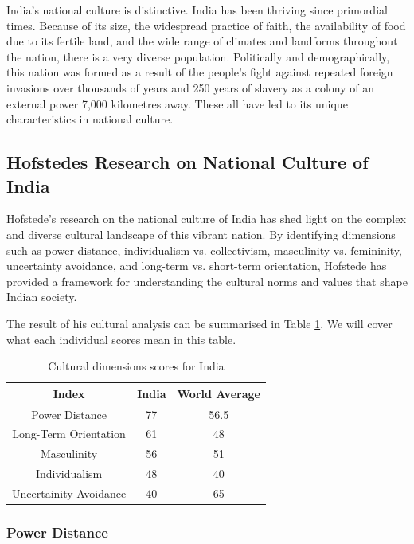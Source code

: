 \documentclass{article}
\begin{document}
India's national culture is distinctive. India has been thriving since primordial times. Because of its size, the widespread practice of faith, the availability of food due to its fertile land, and the wide range of climates and landforms throughout the nation, there is a very diverse population. Politically and demographically, this nation was formed as a result of the people's fight against repeated foreign invasions over thousands of years and 250 years of slavery as a colony of an external power 7,000 kilometres away. These all have led to its unique characteristics in national culture.

\subsection{Hofstedes Research on National Culture of India}

Hofstede's research on the national culture of India\cite{ref:Hofstede's research on the national culture of India} has shed light on the complex and diverse cultural landscape of this vibrant nation. By identifying dimensions such as power distance, individualism vs. collectivism, masculinity vs. femininity, uncertainty avoidance, and long-term vs. short-term orientation, Hofstede has provided a framework for understanding the cultural norms and values that shape Indian society.

The result of his cultural analysis can be summarised in Table \ref{Table 1}. We will cover what each individual scores mean in this table.

\begin{table}
    \begin{center}
    \begin{tabular}{|c|c|c|}
        \hline
        Index & India & World Average \\
        \hline
        Power Distance & 77 & 56.5 \\
        Long-Term Orientation & 61 & 48 \\
        Masculinity & 56 & 51 \\
        Individualism & 48 & 40 \\
        Uncertainity Avoidance & 40 & 65 \\
        \hline
    \end{tabular}
    \caption{Cultural dimensions scores for India}
    \label{Table 1}
    \end{center}
\end{table}

\subsubsection{Power Distance}
\end{document}
